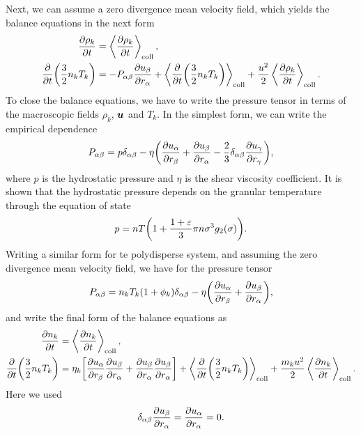 \documentclass[aps,prl,preprint,groupedaddress,10pt]{revtex4-2}
\begin{document}
Next, we can assume a zero divergence mean velocity field, which yields the balance
equations in the next form
\begin{equation}
    \begin{split}
        \pdv{\rho_k}{t} &= \ltx{\avg{\pdv{\rho_k}{t}}}{coll},\\
        \pdv{t}\pqty{\frac{3}{2}n_kT_k} &= -\iab{P}\pdv{\ib{u}}{\ia{r}}+
        \ltx{\avg{\pdv{t}\pqty{\frac{3}{2}n_kT_k}}}{coll}+
        \frac{u^2}{2}\ltx{\avg{\pdv{\rho_k}{t}}}{coll}.
    \end{split}
\end{equation}
To close the balance equations, we have to write the pressure tensor in terms of the macroscopic
fields $\rho_k$, $\vb*{u}$ and $T_k$. In the simplest form, we can write the empirical dependence
\begin{equation}
    \iab{P} = p\iab{\delta}-\eta\pqty{\pdv{\ia{u}}{\ib{r}}+\pdv{\ib{u}}{\ia{r}}
        -\frac{2}{3}\iab{\delta}\pdv{\ig{u}}{\ig{r}}},
\end{equation}
where $p$ is the hydrostatic pressure and $\eta$ is the shear viscosity coefficient. It is shown
that the hydrostatic pressure depends on the granular temperature through the equation of state
\begin{equation}
    p = nT\pqty{1+\frac{1+\eps}{3}\pi n\sigma^{3}g_2\pqty{\sigma}}.
\end{equation}
Writing a similar form for te polydisperse system, and assuming the zero divergence mean velocity
field, we have for the pressure tensor
\begin{equation}
    \iab{P}=n_kT_k(1+\phi_k)\iab{\delta}-\eta\pqty{\pdv{\ia{u}}{\ib{r}}+\pdv{\ib{u}}{\ia{r}}},
\end{equation}
and write the final form of the balance equations as
\begin{equation}
    \begin{split}
        \pdv{n_k}{t} &= \ltx{\avg{\pdv{n_k}{t}}}{coll},\\
        \pdv{t}\pqty{\frac{3}{2}n_kT_k} &=
        \eta_k\bqty{\pdv{\ia{u}}{\ib{r}}\pdv{\ib{u}}{\ia{r}}+\pdv{\ib{u}}{\ia{r}}\pdv{\ib{u}}{\ia{r}}}+
        \ltx{\avg{\pdv{t}\pqty{\frac{3}{2}n_kT_k}}}{coll}+
        \frac{m_ku^2}{2}\ltx{\avg{\pdv{n_k}{t}}}{coll}.
    \end{split}
\end{equation}
Here we used
\begin{equation}
    {\delta}_{\alpha\beta}\pdv{{u}_{\beta}}{{r}_{\alpha}}=\pdv{{u}_{\alpha}}{{r}_{\alpha}}=0.
\end{equation}
\end{document}
